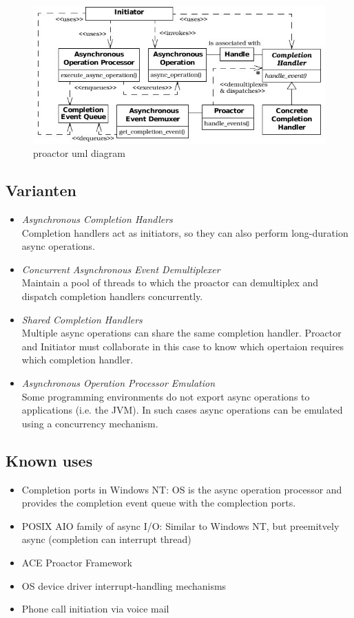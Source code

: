 \begin{figure}[H]
	\centering
	\includegraphics[width=12cm]{content/posa2/proactor/images/uml-diagram.jpeg}
	\caption{proactor uml diagram}
\end{figure}


\subsection*{Varianten}
\begin{itemize}
	\item \emph{Asynchronous Completion Handlers}\\
	Completion handlers act as initiators, so they can also perform long-duration async operations.
	\item \emph{Concurrent Asynchronous Event Demultiplexer}\\
	Maintain a pool of threads to which the proactor can demultiplex and dispatch completion handlers concurrently.
	\item \emph{Shared Completion Handlers}\\
	Multiple async operations can share the same completion handler. Proactor and Initiator must collaborate in this case to know which opertaion requires which completion handler.
	\item \emph{Asynchronous Operation Processor Emulation}\\
	Some programming environments do not export async operations to applications (i.e. the JVM). In such cases async operations can be emulated using a concurrency mechanism.
\end{itemize}


\subsection*{Known uses}

\begin{itemize}
	\item Completion ports in Windows NT: OS is the async operation processor and provides the completion event queue with the complection ports.
	\item POSIX AIO family of async I/O: Similar to Windows NT, but preemitvely async (completion can interrupt thread)
	\item ACE Proactor Framework
	\item OS device driver interrupt-handling mechanisms
	\item Phone call initiation via voice mail
\end{itemize}


